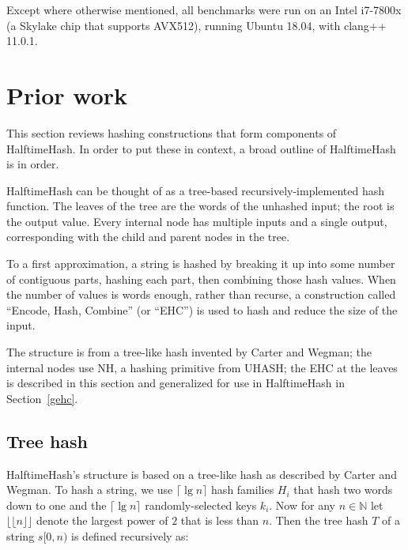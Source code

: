 \documentclass[runningheads]{llncs}
\newcommand{\nats}{\mathbb{N}}
\begin{document}
Except where otherwise mentioned, all benchmarks were run on an Intel i7-7800x (a Skylake chip that supports AVX512), running Ubuntu 18.04, with clang++ 11.0.1.

\section{Prior work}
\label{prior-work}


This section reviews hashing constructions that form components of HalftimeHash.
In order to put these in context, a broad outline of HalftimeHash is in order.

HalftimeHash can be thought of as a tree-based recursively-implemented hash function.
The leaves of the tree are the words of the unhashed input; the root is the output value.
Every internal node has multiple inputs and a single output, corresponding with the child and parent nodes in the tree.

To a first approximation, a string is hashed by breaking it up into some number of contiguous parts, hashing each part, then combining those hash values.
When the number of values is words enough, rather than recurse, a construction called ``Encode, Hash, Combine'' (or ``EHC'') is used to hash and reduce the size of the input.

The structure is from a tree-like hash invented by Carter and Wegman;
the internal nodes use NH, a hashing primitive from UHASH;
the EHC at the leaves is described in this section and generalized for use in HalftimeHash in Section~\ref{gehc}.

\subsection{Tree hash}

HalftimeHash's structure is based on a tree-like hash as described by Carter and Wegman. \cite[Section 3]{carter-wegman-79}
To hash a string, we use $\lceil \lg n \rceil$ hash families $H_i$ that hash two words down to one and the $\lceil \lg n \rceil$ randomly-selected keys $k_i$.
Now for any $n \in \nats$ let $\lfloor\!\lfloor n \rfloor\!\rfloor$ denote the largest power of $2$ that is less than $n$.
Then the tree hash $T$ of a string $s[0,n)$ is defined recursively as:
\end{document}

